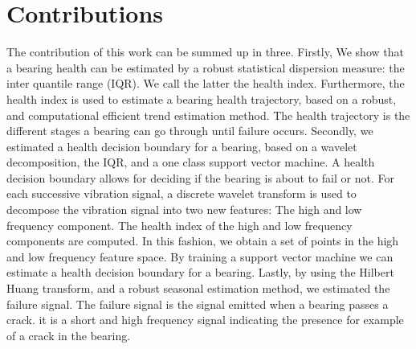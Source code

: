 \documentclass[../Main/thesis.tex]{subfiles}
\begin{document}
\section{Contributions }
\label{sec:contributions}
The contribution of this work can be summed up in three. Firstly, We show that a bearing health can be estimated by a robust statistical dispersion measure: the inter quantile range (IQR). We call the latter the health index. Furthermore,  the health index is used to estimate a bearing health trajectory, based on a robust, and computational efficient trend estimation method. The health trajectory is the different stages a bearing can go through until failure occurs.
\justify
Secondly, we estimated a health decision boundary for a bearing, based on a wavelet decomposition, the IQR, and a one class support vector machine. A health decision boundary allows for deciding if the bearing is about to fail or not. For each successive vibration signal, a discrete wavelet transform is used to decompose the vibration signal into two new features: The high and low frequency component. The health index of the high and low frequency components are computed. In this fashion, we obtain a set of points in the high and low frequency feature space. By training a support vector machine we can estimate a health decision boundary for a bearing.
\justify
Lastly, by using the Hilbert Huang transform, and a robust seasonal estimation method, we estimated the failure signal. The failure signal is the signal emitted when a bearing passes a crack. it is a short and high frequency signal indicating the presence for example of a crack in the bearing.

\blankpage
\end{document}
